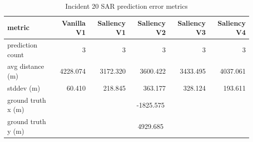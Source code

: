 \begin{table}[ht]
\centering
\caption{Incident 20 SAR prediction error metrics}
\label{tab:sar-incident-20}
\begin{tabular}{lrrrrr}
\hline
metric & Vanilla V1 & Saliency V1 & Saliency V2 & Saliency V3 & Saliency V4 \\
\hline
prediction count & 3 & 3 & 3 & 3 & 3 \\
avg distance (m) & 4228.074 & 3172.320 & 3600.422 & 3433.495 & 4037.061 \\
stddev (m) & 60.410 & 218.845 & 363.177 & 328.124 & 193.611 \\
ground truth x (m) & \multicolumn{5}{c}{-1825.575} \\
ground truth y (m) & \multicolumn{5}{c}{4929.685} \\
\hline
\end{tabular}
\end{table}
